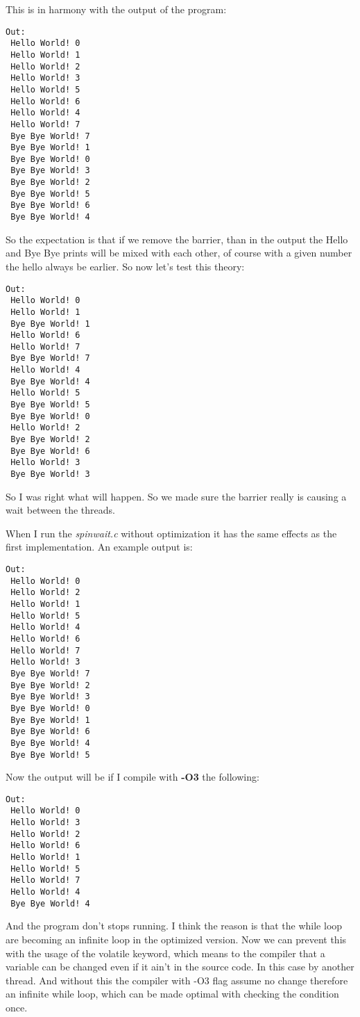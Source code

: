 This is in harmony with the output of the program:

 \begin{lstlisting}[basicstyle=\ttfamily,frame=single]
Out:
 Hello World! 0
 Hello World! 1
 Hello World! 2
 Hello World! 3
 Hello World! 5
 Hello World! 6
 Hello World! 4
 Hello World! 7
 Bye Bye World! 7
 Bye Bye World! 1
 Bye Bye World! 0
 Bye Bye World! 3
 Bye Bye World! 2
 Bye Bye World! 5
 Bye Bye World! 6
 Bye Bye World! 4
\end{lstlisting}

So the expectation is that if we remove the barrier, than in the output the Hello and Bye Bye prints will be mixed with each other, of course with a given number the hello always be earlier. 
So now let's test this theory:

\begin{lstlisting}[basicstyle=\ttfamily, frame=single]
Out: 
 Hello World! 0
 Hello World! 1
 Bye Bye World! 1
 Hello World! 6
 Hello World! 7
 Bye Bye World! 7
 Hello World! 4
 Bye Bye World! 4
 Hello World! 5
 Bye Bye World! 5
 Bye Bye World! 0
 Hello World! 2
 Bye Bye World! 2
 Bye Bye World! 6
 Hello World! 3
 Bye Bye World! 3
\end{lstlisting}

So I was right what will happen. So we made sure the barrier really is causing a wait between the threads.

\bigskip

When I run the \textit{spinwait.c} without optimization it has the same effects as the first implementation. An example output is:

\begin{lstlisting}[basicstyle=\ttfamily, frame=single]
Out: 
 Hello World! 0
 Hello World! 2
 Hello World! 1
 Hello World! 5
 Hello World! 4
 Hello World! 6
 Hello World! 7
 Hello World! 3
 Bye Bye World! 7
 Bye Bye World! 2
 Bye Bye World! 3
 Bye Bye World! 0
 Bye Bye World! 1
 Bye Bye World! 6
 Bye Bye World! 4
 Bye Bye World! 5
\end{lstlisting}

Now the output will be if I compile with \textbf{-O3} the following:
\begin{lstlisting}[basicstyle=\ttfamily, frame=single]
Out:
 Hello World! 0
 Hello World! 3
 Hello World! 2
 Hello World! 6
 Hello World! 1
 Hello World! 5
 Hello World! 7
 Hello World! 4
 Bye Bye World! 4
\end{lstlisting}

And the program don't stops running. I think the reason is that the while loop are becoming an infinite loop in the optimized version. Now we can prevent this with the usage of the volatile keyword, which means to the compiler that a variable can be changed even if it ain't in the source code. In this case by another thread. And without this the compiler with -O3 flag assume no change therefore an infinite while loop, which can be made optimal with checking the condition once.

